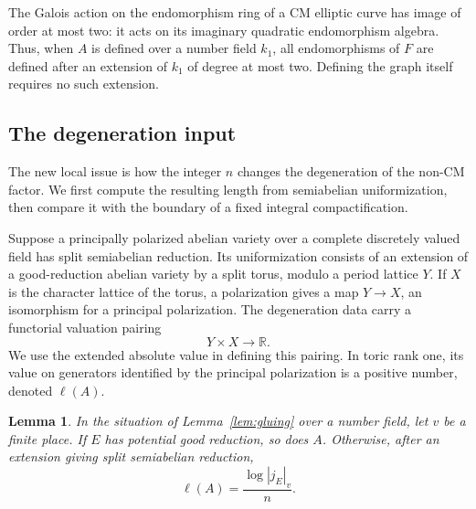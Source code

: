 \documentclass[11pt,a4paper]{article}
\numberwithin{equation}{section}
\newtheorem{lemma}[theorem]{Lemma}
\theoremstyle{definition}
\theoremstyle{remark}
\newcommand{\R}{\mathbb R}
\begin{document}
The Galois action on the endomorphism ring of a CM elliptic curve
has image of order at most two: it acts on its imaginary quadratic
endomorphism algebra. Thus, when \(A\) is defined over a number field
\(k_1\), all endomorphisms of \(F\) are defined after an extension of
\(k_1\) of degree at most two. Defining the graph itself requires
no such extension.

\subsection{The degeneration input}\label{subsec:degeneration}

The new local issue is how the integer \(n\) changes the degeneration
of the non-CM factor. We first compute the resulting length from
semiabelian uniformization, then compare it with the boundary of a
fixed integral compactification.

Suppose a principally polarized abelian variety over a complete
discretely valued field has split semiabelian reduction. Its
uniformization consists of an extension of a good-reduction abelian
variety by a split torus, modulo a period lattice \(Y\).
If \(X\) is the character lattice of the torus, a polarization gives
a map \(Y\to X\), an isomorphism for a principal polarization.
The degeneration data carry a functorial valuation pairing
\[
 Y\times X\longrightarrow\R.
\]
We use the extended absolute value in defining this pairing. In toric
rank one, its value on generators identified by the principal
polarization is a positive number, denoted \(\ell(A)\).

\begin{lemma}\label{lem:length}
In the situation of Lemma~\ref{lem:gluing} over a number field, let
\(v\) be a finite place. If \(E\) has potential good reduction, so
does \(A\). Otherwise, after an extension giving split semiabelian
reduction,
\begin{equation}\label{eq:length}
 \ell(A)=\frac{\log|j_E|_v}{n}.
\end{equation}
\end{lemma}
\end{document}

